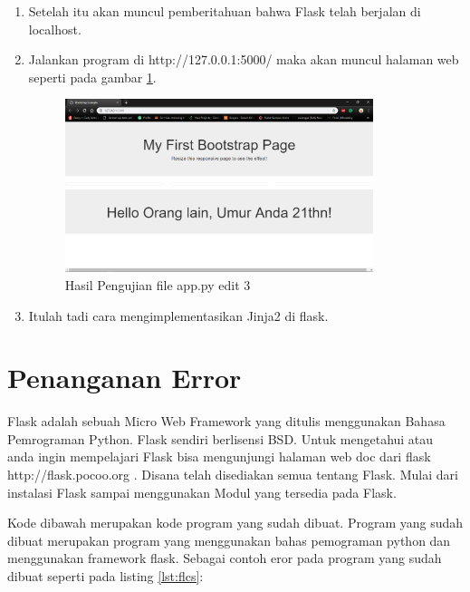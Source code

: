 \begin{enumerate}
\item Setelah itu akan muncul pemberitahuan bahwa Flask telah berjalan di localhost.
\item Jalankan program di http://127.0.0.1:5000/ maka akan muncul halaman web seperti pada gambar \ref{fig:hufa3}.
\begin{figure}[!htbp]
	\centerline{\includegraphics[width=0.85\textwidth]{figures/13/hufa3.PNG}}
	\caption{Hasil Pengujian file app.py edit 3}
	\label{fig:hufa3}
\end{figure}

\item Itulah tadi cara mengimplementasikan Jinja2 di flask.
\end{enumerate}

\section{Penanganan Error}
Flask adalah sebuah Micro Web Framework yang ditulis menggunakan Bahasa Pemrograman Python. Flask sendiri berlisensi BSD.
Untuk mengetahui atau anda ingin mempelajari Flask bisa mengunjungi halaman web doc dari flask http://flask.pocoo.org . Disana telah disediakan semua tentang Flask. Mulai dari instalasi Flask sampai menggunakan Modul yang tersedia pada Flask.

Kode dibawah merupakan kode program yang sudah dibuat. Program yang sudah dibuat merupakan program yang menggunakan bahas pemograman python dan menggunakan framework flask. Sebagai contoh eror pada program yang sudah dibuat seperti pada listing \ref{lst:flcs}:


